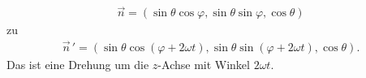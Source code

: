 \documentclass[11pt,a4paper]{scrartcl}
\begin{document}
\begin{enumerate}[label=(\alph*)]
\begin{calculationbox}
\begin{calculationbox}[title=Zeitentwicklung um die $z$-Achse]
\begin{align*}
                    \vec n
                    =
                    \left(
                        \sin\theta\cos\varphi,
                        \sin\theta\sin\varphi,
                        \cos\theta
                    \right)
                \end{align*}
                zu
                \begin{align*}
                    \vec n\,'
                    =
                    \left(
                        \sin\theta\cos(\varphi+2\omega t),
                        \sin\theta\sin(\varphi+2\omega t),
                        \cos\theta
                    \right).
                \end{align*}
                Das ist eine Drehung um die $z$-Achse mit Winkel $2\omega t$.
            \end{calculationbox}


\end{calculationbox}
\end{enumerate}
\end{document}
